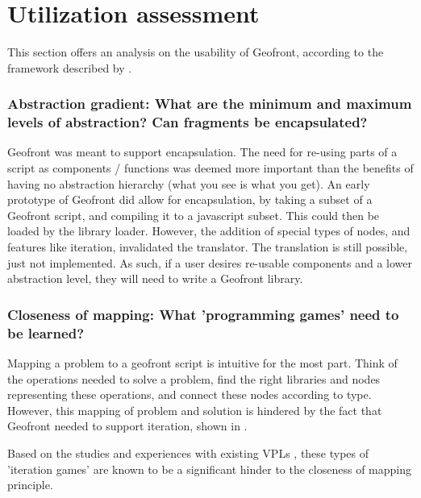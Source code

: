 \section{Utilization assessment}
\label{sec:testing:usability}


This section offers an analysis on the usability of Geofront, according to the framework described by \cite[]{green_usability_1996}.

\subsubsection*{Abstraction gradient: What are the minimum and maximum levels of abstraction? Can fragments be encapsulated?}

Geofront was meant to support encapsulation. 
The need for re-using parts of a script as components / functions was deemed more important than the benefits of having no abstraction hierarchy (what you see is what you get).
An early prototype of Geofront did allow for encapsulation, by taking a subset of a Geofront script, and compiling it to a javascript subset. This could then be loaded by the library loader. 
However, the addition of special types of nodes, and features like iteration, invalidated the  translator.
The translation is still possible, just not implemented.  
As such, if a user desires re-usable components and a lower abstraction level, they will need to write a Geofront library.


\subsubsection*{Closeness of mapping: What 'programming games' need to be learned?}

Mapping a problem to a geofront script is intuitive for the most part.
Think of the operations needed to solve a problem, 
find the right libraries and nodes representing these operations,
and connect these nodes according to type. 
However, this mapping of problem and solution is hindered by the fact that Geofront needed to support iteration, shown in . 

Based on the studies and experiences with existing VPLs , these types of 'iteration games' are known to be a significant hinder to the closeness of mapping principle.

